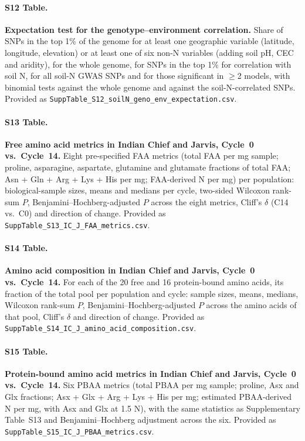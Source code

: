 \paragraph*{S12 Table.}
\makeatletter
\def\@currentlabelname{S12 Table}
\makeatother
\label{S12_Table}
\textbf{Expectation test for the genotype--environment correlation.} Share of SNPs in the top 1\% of the genome for at least one geographic variable (latitude, longitude, elevation) or at least one of six non-N variables (adding soil pH, CEC and aridity), for the whole genome, for SNPs in the top 1\% for correlation with soil N, for all soil-N GWAS SNPs and for those significant in $\geq$2 models, with binomial tests against the whole genome and against the soil-N-correlated SNPs. Provided as \texttt{SuppTable\_S12\_soilN\_geno\_env\_expectation.csv}.

\paragraph*{S13 Table.}
\makeatletter
\def\@currentlabelname{S13 Table}
\makeatother
\label{S13_Table}
\textbf{Free amino acid metrics in Indian Chief and Jarvis, Cycle~0 vs.\ Cycle~14.} Eight pre-specified FAA metrics (total FAA per mg sample; proline, asparagine, aspartate, glutamine and glutamate fractions of total FAA; Asn + Gln + Arg + Lys + His per mg; FAA-derived N per mg) per population: biological-sample sizes, means and medians per cycle, two-sided Wilcoxon rank-sum $P$, Benjamini--Hochberg-adjusted $P$ across the eight metrics, Cliff's $\delta$ (C14 vs.\ C0) and direction of change. Provided as \texttt{SuppTable\_S13\_IC\_J\_FAA\_metrics.csv}.

\paragraph*{S14 Table.}
\makeatletter
\def\@currentlabelname{S14 Table}
\makeatother
\label{S14_Table}
\textbf{Amino acid composition in Indian Chief and Jarvis, Cycle~0 vs.\ Cycle~14.} For each of the 20 free and 16 protein-bound amino acids, its fraction of the total pool per population and cycle: sample sizes, means, medians, Wilcoxon rank-sum $P$, Benjamini--Hochberg-adjusted $P$ across the amino acids of that pool, Cliff's $\delta$ and direction of change. Provided as \texttt{SuppTable\_S14\_IC\_J\_amino\_acid\_composition.csv}.

\paragraph*{S15 Table.}
\makeatletter
\def\@currentlabelname{S15 Table}
\makeatother
\label{S15_Table}
\textbf{Protein-bound amino acid metrics in Indian Chief and Jarvis, Cycle~0 vs.\ Cycle~14.} Six PBAA metrics (total PBAA per mg sample; proline, Asx and Glx fractions; Asx + Glx + Arg + Lys + His per mg; estimated PBAA-derived N per mg, with Asx and Glx at 1.5 N), with the same statistics as Supplementary Table~S13 and Benjamini--Hochberg adjustment across the six. Provided as \texttt{SuppTable\_S15\_IC\_J\_PBAA\_metrics.csv}.

